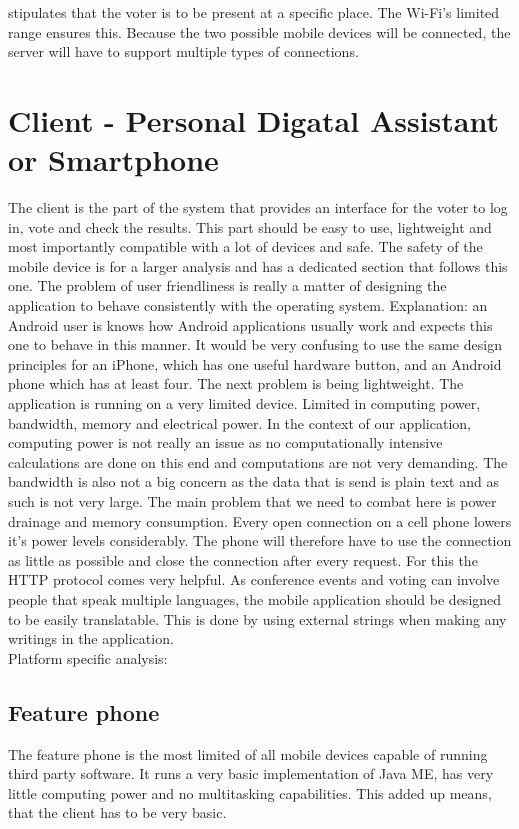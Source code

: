 \documentclass[11pt,twoside,a4paper]{book}
\begin{document}
stipulates that the voter is to be present at a specific place. The Wi-Fi's limited range ensures this. Because the two possible mobile devices will be connected, the server will have to support multiple types of connections.

\section{Client - Personal Digatal Assistant or Smartphone}
The client is the part of the system that provides an interface for the voter to log in, vote and check the results. This part should be easy to use, lightweight and most importantly compatible with a lot of devices and safe. The safety of the mobile device is for a larger analysis and has a dedicated section that follows this one. The problem of user friendliness is really a matter of designing the application to behave consistently with the operating system. Explanation: an Android user is knows how Android applications usually work and expects this one to behave in this manner. It would be very confusing to use the same design principles for an iPhone, which has one useful hardware button, and an Android phone which has at least four. The next problem is being lightweight. The application is running on a very limited device. Limited in computing power, bandwidth, memory and electrical power. In the context of our application, computing power is not really an issue as no computationally intensive calculations are done on this end and computations are not very demanding. The bandwidth is also not a big concern as the data that is send is plain text and as such is not very large. The main problem that we need to combat here is power drainage and memory consumption. Every open connection on a cell phone lowers it's power levels considerably. The phone will therefore have to use the connection as little as possible and close the connection after every request. For this the HTTP protocol comes very helpful. As conference events and voting can involve people that speak multiple languages, the mobile application should be designed to be easily translatable. This is done by using external strings when making any writings in the application.\\
Platform specific analysis:
\subsection{Feature phone}
The feature phone is the most limited of all mobile devices capable of running third party software. It runs a very basic implementation of Java ME, has very little computing power and no multitasking capabilities. This added up means, that the client has to be very basic.
\end{document}
